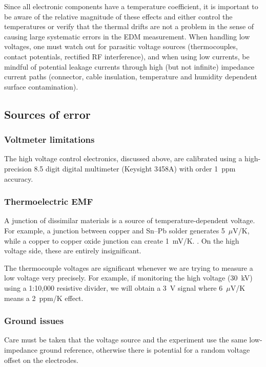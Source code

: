 Since all electronic components have a temperature coefficient, it is important
to be aware of the relative magnitude of these effects and either control the
temperatures or verify that the thermal drifts are not a problem in the sense of
causing large systematic errors in the \gls{EDM} measurement. When handling low
voltages, one must watch out for parasitic voltage sources (thermocouples,
contact potentials, rectified RF interference), and when using low currents, be
mindful of potential leakage currents through high (but not infinite) impedance
current paths (connector, cable insulation, temperature and humidity dependent
surface contamination).

\subsection{Sources of error}

\subsubsection{Voltmeter limitations}

The high voltage control electronics, discussed above, are calibrated using a
high-precision 8.5 digit digital multimeter (Keysight 3458A) with order 1~ppm
accuracy.

\subsubsection{Thermoelectric EMF}

A junction of dissimilar materials is a source of temperature-dependent voltage.
For example, a junction between copper and Sn--Pb solder generates
5~$\mu$V/K, while a copper to copper oxide junction can create 1~mV/K.
\cite[sect.~5.11.4B]{horowitz2016art}. On the high voltage side, these are
entirely insignificant.

The thermocouple voltages are significant whenever
we are trying to measure a low voltage very precisely. For example, if
monitoring the high voltage (30~kV) using a 1:10,000 resistive divider, we will
obtain a 3~V signal where 6~$\mu$V/K means a 2~ppm/K effect.

\subsubsection{Ground issues}

Care must be taken that the voltage source and the experiment use the same
low-impedance ground reference, otherwise there is potential for a random
voltage offset on the electrodes.

